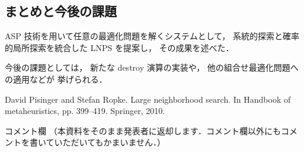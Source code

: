 \documentclass[a4j,10pt]{jarticle}
\begin{document}
\begin{multicols}{1}
\section{まとめと今後の課題}
ASP 技術を用いて任意の最適化問題を解くシステムとして，
系統的探索と確率的局所探索を統合した LNPS を提案し，
その成果を述べた．

今後の課題としては，
新たな destroy 演算の実装や，
他の組合せ最適化問題への適用などが
挙げられる．

\begin{thebibliography}{10}

David Pisinger and Stefan Ropke. 
Large neighborhood search. 
In Handbook of metaheuristics, pp. 399–419. Springer, 2010.

\end{thebibliography}

\end{multicols}
\vfill
\noindent
{\gt コメント欄}
{\footnotesize
（本資料をそのまま発表者に返却します．コメント欄以外にもコメントを書いていただいてもかまいません．）}
\\
\fbox{\begin{minipage}{\textwidth}\noindent\\\\\end{minipage}}	
\end{document}

